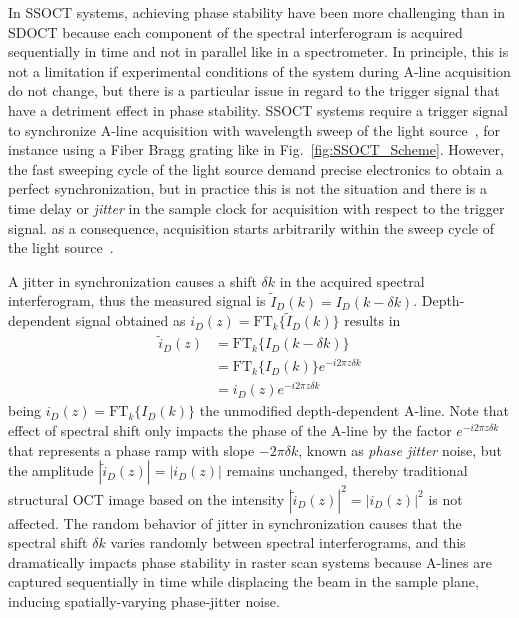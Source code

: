 In SSOCT systems, achieving phase stability have been more challenging than in SDOCT because each component of the spectral interferogram is acquired sequentially in time and not in parallel like in a spectrometer. In principle, this is not a limitation if experimental conditions of the system during A-line acquisition do not change, but there is a particular issue in regard to the trigger signal that have a detriment effect in phase stability. SSOCT systems require a trigger signal to synchronize A-line acquisition with wavelength sweep of the light source~\cite{Vakoc2005_Phaseresolved}, for instance using a Fiber Bragg grating like in Fig.~\ref{fig:SSOCT_Scheme}. However, the fast sweeping cycle of the light source demand precise electronics to obtain a perfect synchronization, but in practice this is not the situation and there is a time delay or \textit{jitter} in the sample clock for acquisition with respect to the trigger signal. as a consequence, acquisition starts arbitrarily within the sweep cycle of the light source~\cite{Vakoc2005_Phaseresolved}.

A jitter in synchronization causes a shift $\delta k$ in the acquired spectral interferogram, thus the measured signal is $\tilde{I}_D(k) = I_D(k-\delta k)$. Depth-dependent signal obtained as $i_D(z)= \text{FT}_k\{\tilde{I}_D(k)\}$ results in~\cite{Hong2012_Highpenetration}
\begin{align} \label{eq:phaseJitter}
    \tilde{i}_D(z) &= \text{FT}_k\{I_D(k-\delta k)\} \nonumber \\
    &=  \text{FT}_k\{I_D(k)\} e^{-i2\pi z\delta k} \nonumber \\
    &=  i_D(z) e^{-i2\pi z\delta k}
\end{align}
being $i_D(z)=\text{FT}_k\{I_D(k)\}$ the unmodified depth-dependent A-line. Note that effect of spectral shift only impacts the phase of the A-line by the factor $e^{-i2\pi z\delta k}$ that represents a phase ramp with slope $-2\pi\delta k$, known as \textit{phase jitter} noise, but the amplitude $|\tilde{i}_D(z)|=|i_D(z)|$ remains unchanged, thereby traditional structural OCT image based on the intensity $|\tilde{i}_D(z)|^2=|i_D(z)|^2$ is not affected. The random behavior of jitter in synchronization causes that the spectral shift $\delta k$ varies randomly between spectral interferograms, and this dramatically impacts phase stability in raster scan systems because A-lines are captured sequentially in time while displacing the beam in the sample plane, inducing spatially-varying phase-jitter noise.

